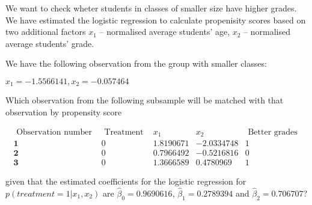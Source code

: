 
\begin{question}
We want to check wheter students in classes of smaller size have higher grades. We have estimated the logistic regression to calculate propenisity scores based on two additional factors \(x_1\) -- normalised average students' age, \(x_2\) -- normalised average students' grade.

We have the following observation from the group with smaller classes:

\(x_1=-1.5566141, x_2=-0.057464\)

Which observation from the following subsample will be matched with that observation by propensity score

\[
\begin{array}{rrrrr} 
 \text { Observation number }&  \text { Treatment } &  x_1  &  x_2  & \text { Better grades } \\
\hline 
 \mathbf{1} & 0 & 1.8190671 & -2.0334748 & 1 \\
 \mathbf{2} & 0 & 0.7966492 & -0.5216816  & 0 \\
 \mathbf{3} & 0 &  1.3666589  & 0.4780969   & 1
\end{array}
\]

given that the estimated coefficients for the logistic regression for \(p(treatment=1|x_1,x_2)\) are \(\hat{\beta}_0 = 0.9690616\), \(\hat{\beta}_1 = 0.2789394\) and \(\hat{\beta}_2 = 0.706707\)?
\end{question}


